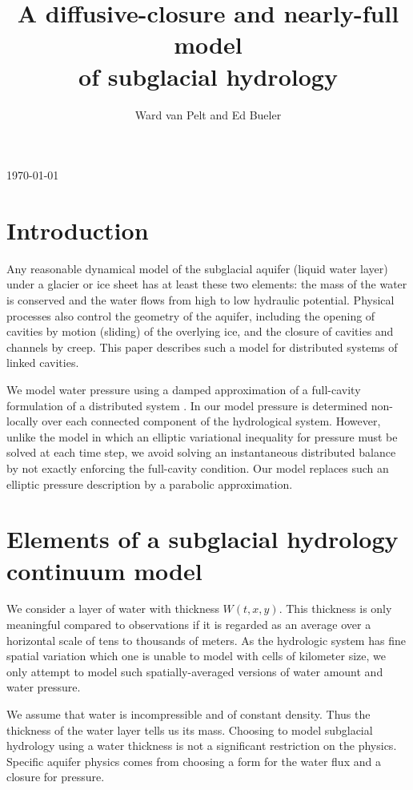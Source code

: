 \documentclass[11pt,final]{amsart}%
\title[]{A diffusive-closure and nearly-full model \\ of subglacial hydrology}
\author[]{Ward van Pelt and Ed Bueler}
\begin{document}
\scriptsize \hfill \today \normalsize
\vspace{0.5in}

\maketitle
\thispagestyle{empty}

\section{Introduction}

Any reasonable dynamical model of the subglacial aquifer (liquid water layer) under a glacier or ice sheet has at least these two elements: the mass of the water is conserved and the water flows from high to low hydraulic potential.  Physical processes also control the geometry of the aquifer, including the opening of cavities by motion (sliding) of the overlying ice, and the closure of cavities and channels by creep.  This paper describes such a model for distributed systems of linked cavities. 

We model water pressure using a damped approximation of a full-cavity formulation of a distributed system \cite{Schoofetal2012}.  In our model pressure is determined non-locally over each connected component of the hydrological system.  However, unlike the \cite{Schoofetal2012} model in which an elliptic variational inequality for pressure must be solved at each time step, we avoid solving an instantaneous distributed balance by not exactly enforcing the full-cavity condition.  Our model replaces such an elliptic pressure description by a parabolic approximation.


\section{Elements of a subglacial hydrology continuum model}

We consider a layer of water with thickness $W(t,x,y)$.  This thickness is only meaningful compared to observations if it is regarded as an average \citep{FlowersClarke2002_theory} over a horizontal scale of tens to thousands of meters.  As the hydrologic system has fine spatial variation which one is unable to model with cells of kilometer size, we only attempt to model such spatially-averaged versions of water amount and water pressure.

We assume that water is incompressible and of constant density.  Thus the thickness of the water layer tells us its mass.  Choosing to model subglacial hydrology using a water thickness is not a significant restriction on the physics.  Specific aquifer physics comes from choosing a form for the water flux and a closure for pressure.
\end{document}
